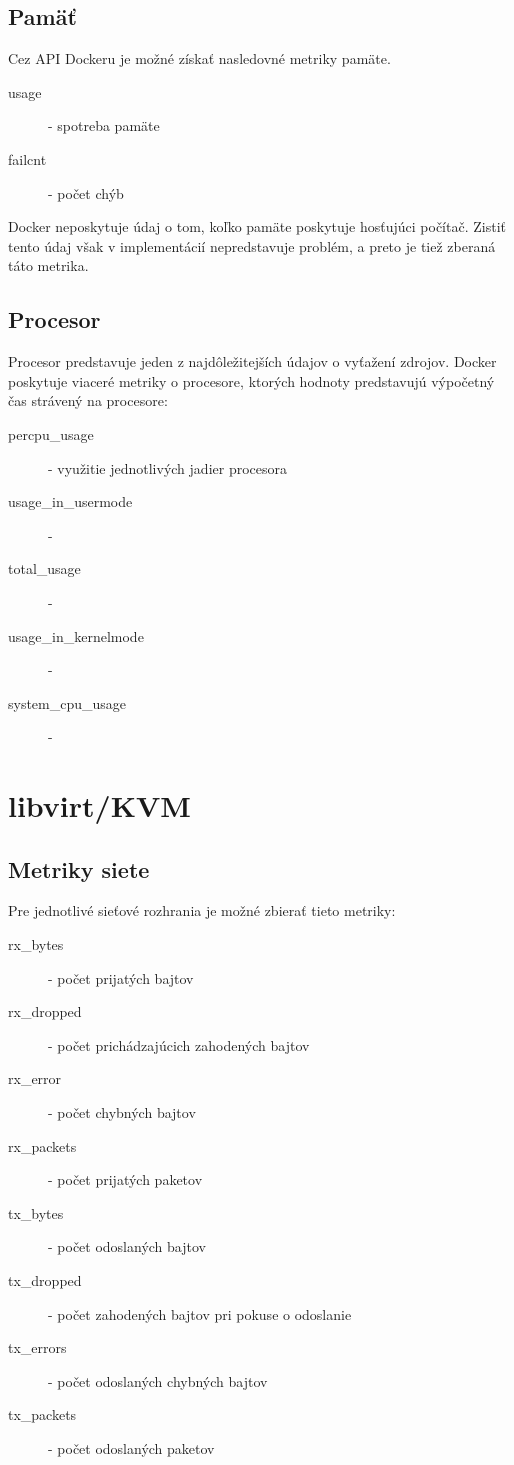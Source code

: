 \documentclass[11pt,final,oneside]{fithesis}
\begin{document}
\subsection{Pamäť}
Cez API Dockeru je možné získať nasledovné metriky pamäte.
\begin{description}
\item[usage] - spotreba pamäte
\item[failcnt] - počet chýb
\end{description}
Docker neposkytuje údaj o tom, koľko pamäte poskytuje hosťujúci počítač. Zistiť tento údaj však v implementácií nepredstavuje problém,
a preto je tiež zberaná táto metrika.

\subsection{Procesor}
Procesor predstavuje jeden z najdôležitejších údajov o vyťažení zdrojov. Docker poskytuje viaceré metriky o procesore, ktorých hodnoty 
predstavujú výpočetný čas strávený na procesore: 
\begin{description}
\item[percpu\_usage] - využitie jednotlivých jadier procesora
\item[usage\_in\_usermode] - 
\item[total\_usage] - 
\item[usage\_in\_kernelmode] - 
\item[system\_cpu\_usage] - 
\end{description}

\section{libvirt/KVM}

\subsection{Metriky siete}
Pre jednotlivé sieťové rozhrania je možné zbierať tieto metriky:
\begin{description}
\item[rx\_bytes] - počet prijatých bajtov
\item[rx\_dropped] - počet prichádzajúcich zahodených bajtov
\item[rx\_error] - počet chybných bajtov
\item[rx\_packets] - počet prijatých paketov
\item[tx\_bytes] - počet odoslaných bajtov
\item[tx\_dropped] - počet zahodených bajtov pri pokuse o odoslanie
\item[tx\_errors] - počet odoslaných chybných bajtov
\item[tx\_packets] - počet odoslaných paketov
\end{description}
\end{document}
